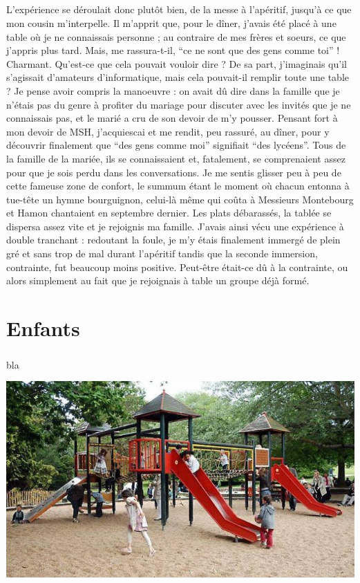 \paragraph{}
L’expérience se déroulait donc plutôt bien, de la messe à l’apéritif, jusqu’à ce que mon cousin m’interpelle. Il m’apprit que, pour le dîner, j’avais été placé à une table où je ne connaissais personne ; au contraire de mes frères et soeurs, ce que j’appris plus tard. Mais, me rassura-t-il, “ce ne sont que des gens comme toi” ! Charmant. Qu’est-ce que cela pouvait vouloir dire ? De sa part, j’imaginais qu’il s’agissait d’amateurs d’informatique, mais cela pouvait-il remplir toute une table ? Je pense avoir compris la manoeuvre : on avait dû dire dans la famille que je n’étais pas du genre à profiter du mariage pour discuter avec les invités que je ne connaissais pas, et le marié a cru de son devoir de m’y pousser. Pensant fort à mon devoir de MSH, j’acquiescai et me rendit, peu rassuré, au dîner, pour y découvrir finalement que “des gens comme moi” signifiait “des lycéens”. Tous de la famille de la mariée, ils se connaissaient et, fatalement, se comprenaient assez pour que je sois perdu dans les conversations. Je me sentis glisser peu à peu de cette fameuse zone de confort, le summum étant le moment où chacun entonna à tue-tête un hymne bourguignon, celui-là même qui coûta à Messieurs Montebourg et Hamon chantaient en septembre dernier.
Les plats débarassés, la tablée se dispersa assez vite et je rejoignis ma famille. J’avais ainsi vécu une expérience à double tranchant : redoutant la foule, je m’y étais finalement immergé de plein gré et sans trop de mal durant l’apéritif tandis que la seconde immersion, contrainte, fut beaucoup moins positive. Peut-être était-ce dû à la contrainte, ou alors simplement au fait que je rejoignais à table un groupe déjà formé.


\chapter{Enfants}
\paragraph{}
bla
\begin{center}
\includegraphics[scale=0.7]{enfants.jpg}
\end{center}
